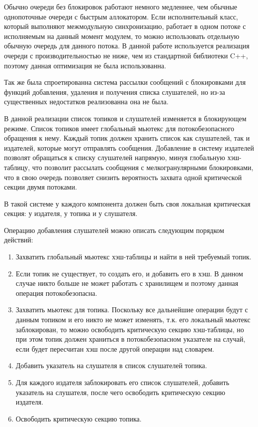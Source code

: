 Обычно очереди без блокировок работают немного медленнее, чем обычные однопоточные очереди с быстрым аллокатором. Если исполнительный класс, который выполняют межмодульную синхронизацию, работает в одном потоке с исполняемым на данный момент модулем, то можно использовать отдельную обычную очередь для данного потока. В данной работе используется реализация очереди с производительностью не ниже, чем из стандартной библиотеки C++, поэтому данная оптимизация не была использованна.

Так же была спроетированна система рассылки сообщений с блокировками для функций добавления, удаления и получения списка слушателей, но из-за существенных недостатков реализованна она не была.

В данной реализации список топиков и слушателей изменяется в блокирующем режиме. Список топиков имеет глобальный мьютекс для потокобезопасного обращения к нему. Каждый топик должен хранить список как слушателей, так и издателей, которые могут отправлять сообщения. Добавление в систему издателей позволят обращаться к списку слушателей напрямую, минуя глобальную хэш-таблицу, что позволит рассылать сообщения с мелкогранулярными блокировками, что в свою очередь позволяет снизить вероятность захвата одной критической секции двумя потоками.

В такой системе у каждого компонента должен быть своя локальная критическая секция: у издателя, у топика и у слушателя.

Операцию добавления слушателей можно описать следующим порядком действий:

\begin{enumerate}
	\item Захватить глобальный мьютекс хэш-таблицы и найти в ней требуемый топик.
	\item Если топик не существует, то создать его, и добавить его в хэш. В данном случае никто больше не может работать с хранилищем и поэтому данная операция потокобезопасна.
	\item Захватить мьютекс для топика. Поскольку все дальнейшие операции будут с данным топиком и его никто не может изменять, т.к. его локальный мьютекс заблокирован, то можно освободить критическую секцию хэш-таблицы, но при этом топик должен храниться в потокобезопасном указателе на случай, если будет пересчитан хэш после другой операции над словарем.
	\item Добавить указатель на слушателя в список слушателей топика.
	\item Для каждого издателя заблокировать его список слушателей, добавить указатель на слушателя, после чего освободить критическую секцию издателя.
	\item Освободить критическую секцию топика.
\end{enumerate}

